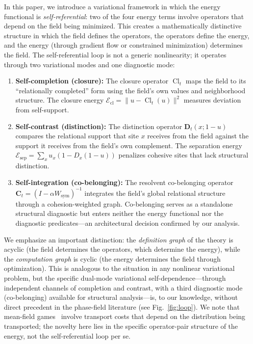 \documentclass[lettersize,journal]{IEEEtran}
\DeclareMathOperator{\Cl}{Cl}
\begin{document}
In this paper, we introduce a variational framework in which the energy functional is \emph{self-referential}: two of the four energy terms involve operators that depend on the field being minimized. This creates a mathematically distinctive structure in which the field defines the operators, the operators define the energy, and the energy (through gradient flow or constrained minimization) determines the field. The self-referential loop is not a generic nonlinearity; it operates through two variational modes and one diagnostic mode:

\begin{enumerate}
\item \textbf{Self-completion (closure):} The closure operator $\Cl_t$ maps the field to its ``relationally completed'' form using the field's own values and neighborhood structure. The closure energy $\mathcal{E}_{\mathrm{cl}} = \|u - \Cl_t(u)\|^2$ measures deviation from self-support.

\item \textbf{Self-contrast (distinction):} The distinction operator $\mathbf{D}_t(x; 1-u)$ compares the relational support that site $x$ receives from the field against the support it receives from the field's own complement. The separation energy $\mathcal{E}_{\mathrm{sep}} = \sum_x u_x(1 - D_x(1-u))$ penalizes cohesive sites that lack structural distinction.

\item \textbf{Self-integration (co-belonging):} The resolvent co-belonging operator $\mathbf{C}_t = (I - \alpha W_{\mathrm{sym}})^{-1}$ integrates the field's global relational structure through a cohesion-weighted graph. Co-belonging serves as a standalone structural diagnostic but enters neither the energy functional nor the diagnostic predicates---an architectural decision confirmed by our analysis.
\end{enumerate}

We emphasize an important distinction: the \emph{definition graph} of the theory is acyclic (the field determines the operators, which determine the energy), while the \emph{computation graph} is cyclic (the energy determines the field through optimization). This is analogous to the situation in any nonlinear variational problem, but the specific dual-mode variational self-dependence---through independent channels of completion and contrast, with a third diagnostic mode (co-belonging) available for structural analysis---is, to our knowledge, without direct precedent in the phase-field literature (see Fig.~\ref{fig:loop}). We note that mean-field games~\cite{LasryLions2007} involve transport costs that depend on the distribution being transported; the novelty here lies in the specific operator-pair structure of the energy, not the self-referential loop per se.
\end{document}
